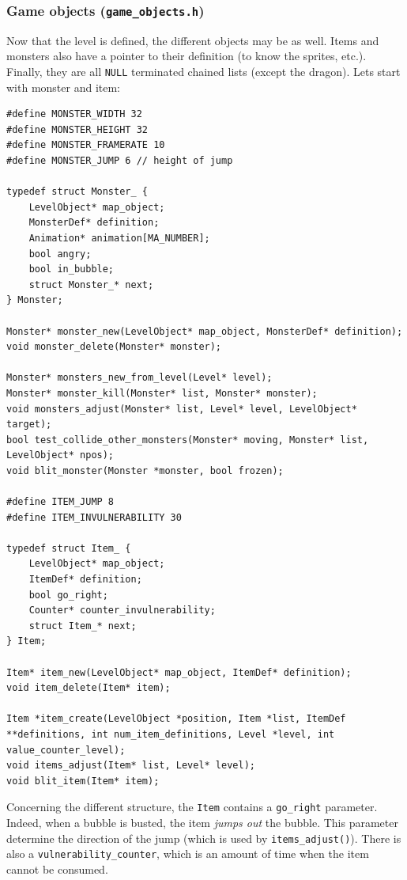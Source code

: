 \documentclass[12pt,a4paper]{article}
\newcommand{\cc}[1]{\texttt{#1}}
\begin{document}
\subsubsection{Game objects (\texttt{game\_objects.h})}

Now that the level is defined, the different objects may be as well. Items and monsters also have a pointer to their definition (to know the sprites, etc.). Finally, they are all \cc{NULL} terminated chained lists (except the dragon). Lets start with monster and item:

\begin{verbatim}
#define MONSTER_WIDTH 32
#define MONSTER_HEIGHT 32
#define MONSTER_FRAMERATE 10
#define MONSTER_JUMP 6 // height of jump

typedef struct Monster_ {
    LevelObject* map_object;
    MonsterDef* definition;
    Animation* animation[MA_NUMBER];
    bool angry;
    bool in_bubble;
    struct Monster_* next;
} Monster;

Monster* monster_new(LevelObject* map_object, MonsterDef* definition);
void monster_delete(Monster* monster);

Monster* monsters_new_from_level(Level* level);
Monster* monster_kill(Monster* list, Monster* monster);
void monsters_adjust(Monster* list, Level* level, LevelObject* target);
bool test_collide_other_monsters(Monster* moving, Monster* list, LevelObject* npos);
void blit_monster(Monster *monster, bool frozen);

#define ITEM_JUMP 8
#define ITEM_INVULNERABILITY 30

typedef struct Item_ {
    LevelObject* map_object;
    ItemDef* definition;
    bool go_right;
    Counter* counter_invulnerability;
    struct Item_* next;
} Item;

Item* item_new(LevelObject* map_object, ItemDef* definition);
void item_delete(Item* item);

Item *item_create(LevelObject *position, Item *list, ItemDef **definitions, int num_item_definitions, Level *level, int value_counter_level);
void items_adjust(Item* list, Level* level);
void blit_item(Item* item);
\end{verbatim}

Concerning the different structure, the \cc{Item} contains a \cc{go_right} parameter. Indeed, when a bubble is busted, the item \textit{jumps out} the bubble. This parameter determine the direction of the jump (which is used by \cc{items_adjust()}). There is also a \cc{vulnerability_counter}, which is an amount of time when the item cannot be consumed.
\end{document}
